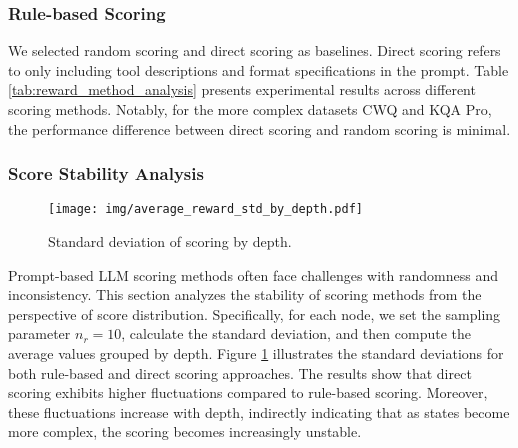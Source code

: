 \subsubsection{Rule-based Scoring}\label{sec:cot_rule_analysis}

\begin{table}
\caption{Comparison of different scoring methods.}
\label{tab:reward_method_analysis}
\end{table}

We selected random scoring and direct scoring as baselines. Direct scoring refers to only including tool descriptions and format specifications in the prompt. 
Table \ref{tab:reward_method_analysis} presents experimental results across different scoring methods. Notably, for the more complex datasets CWQ and KQA Pro, the performance difference between direct scoring and random scoring is minimal.

\subsubsection{Score Stability Analysis}

\begin{figure}[htbp]
    \centering
    \texttt{[image: img/average\_reward\_std\_by\_depth.pdf]}
    \caption{Standard deviation of scoring by depth.}
    \label{fig:reward_std_by_depth_analysis}
\end{figure}

Prompt-based LLM scoring methods often face challenges with randomness and inconsistency. This section analyzes the stability of scoring methods from the perspective of score distribution.
Specifically, for each node, we set the sampling parameter $n_r=10$, calculate the standard deviation, and then compute the average values grouped by depth.
Figure \ref{fig:reward_std_by_depth_analysis} illustrates the standard deviations for both rule-based and direct scoring approaches. The results show that direct scoring exhibits higher fluctuations compared to rule-based scoring. Moreover, these fluctuations increase with depth, indirectly indicating that as states become more complex, the scoring becomes increasingly unstable.


